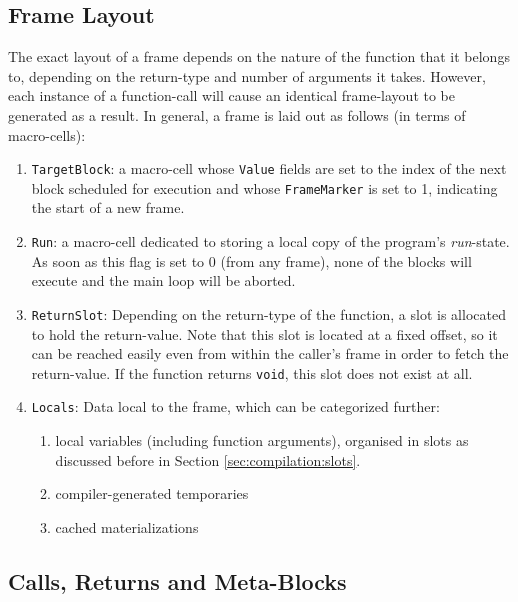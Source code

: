 \subsection{Frame Layout}
\label{sec:compilation:framelayout}
The exact layout of a frame depends on the nature of the function that it belongs to, depending on the return-type and number of arguments it takes. However, each instance of a function-call will cause an identical frame-layout to be generated as a result. In general, a frame is laid out as follows (in terms of macro-cells):
\begin{enumerate}
\item \texttt{TargetBlock}: a macro-cell whose \texttt{Value} fields are set to the index of the next block scheduled for execution and whose \texttt{FrameMarker} is set to 1, indicating the start of a new frame.
\item \texttt{Run}: a macro-cell dedicated to storing a local copy of the program's \emph{run}-state. As soon as this flag is set to 0 (from any frame), none of the blocks will execute and the main loop will be aborted.
\item \texttt{ReturnSlot}: Depending on the return-type of the function, a slot is allocated to hold the return-value. Note that this slot is located at a fixed offset, so it can be reached easily even from within the caller's frame in order to fetch the return-value. If the function returns \texttt{void}, this slot does not exist at all.
\item \texttt{Locals}: Data local to the frame, which can be categorized further:
  \begin{enumerate}
  \item local variables (including function arguments), organised in slots as discussed before in Section \ref{sec:compilation:slots}.
  \item compiler-generated temporaries
  \item cached materializations
  \end{enumerate}
\end{enumerate}

\subsection{Calls, Returns and Meta-Blocks}
\label{sec:compilation:metablocks}

